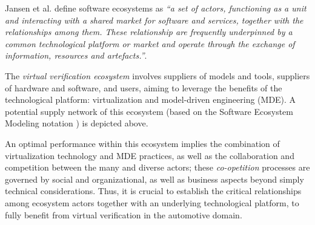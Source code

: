 \small
Jansen et al. \cite{Jansen2009} define software ecosystems as \emph{``a set of actors, functioning as a unit and interacting with a shared market for software and services, together with the relationships among them. These relationship are frequently underpinned by a common technological platform or market and operate through the exchange of information, resources and artefacts.''}.


The \emph{virtual verification ecosystem}
\cite{Knauss2014d} involves suppliers of models and tools, suppliers of hardware and software, and users, aiming to leverage the benefits of the technological platform: virtualization and model-driven engineering (MDE).
A potential supply network of this ecosystem (based on the Software Ecosystem Modeling notation \cite{Boucharas2009}) is depicted above.

An optimal performance within this ecosystem implies the combination of virtualization technology and MDE practices, as well as the collaboration and competition between the many and diverse actors; these \emph{co-opetition} processes \cite{Agerfalk2008} are governed by social and organizational, as well as business aspects beyond simply technical considerations.
%
%
%
Thus, it is crucial to establish the critical relationships among ecosystem actors together with an underlying technological platform, to fully benefit from virtual verification in the automotive domain.

